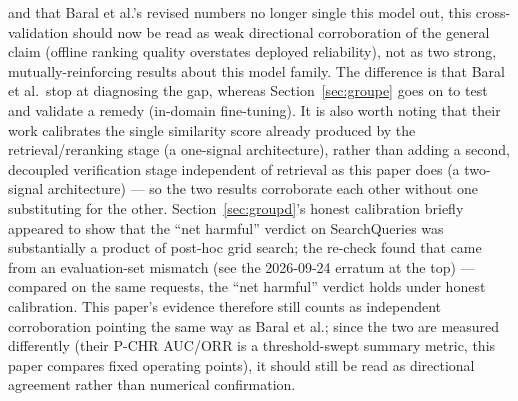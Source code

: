\documentclass[11pt]{article}
\begin{document}
and that Baral et al.'s revised numbers no longer single this model out, this cross-validation should now be read as weak directional corroboration of the general claim (offline ranking quality overstates deployed reliability), not as two strong, mutually-reinforcing results about this model family. The difference is that Baral et al.\ stop at diagnosing the gap, whereas Section~\ref{sec:groupe} goes on to test and validate a remedy (in-domain fine-tuning). It is also worth noting that their work calibrates the single similarity score already produced by the retrieval/reranking stage (a one-signal architecture), rather than adding a second, decoupled verification stage independent of retrieval as this paper does (a two-signal architecture) --- so the two results corroborate each other without one substituting for the other. Section~\ref{sec:groupd}'s honest calibration briefly appeared to show that the ``net harmful'' verdict on SearchQueries was substantially a product of post-hoc grid search; the re-check found that came from an evaluation-set mismatch (see the 2026-09-24 erratum at the top) --- compared on the same requests, the ``net harmful'' verdict holds under honest calibration. This paper's evidence therefore still counts as independent corroboration pointing the same way as Baral et al.; since the two are measured differently (their P-CHR AUC/ORR is a threshold-swept summary metric, this paper compares fixed operating points), it should still be read as directional agreement rather than numerical confirmation.
\end{document}
